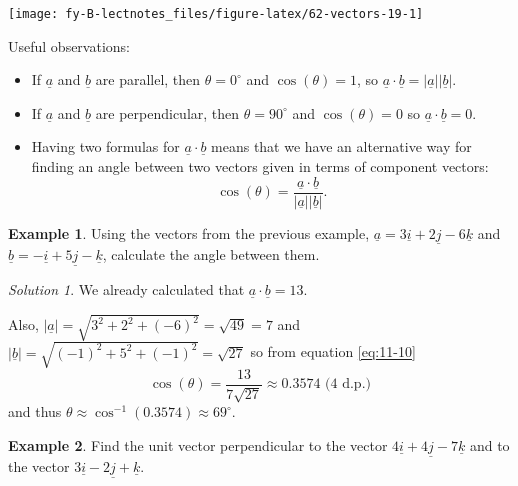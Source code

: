 \documentclass[
  11pt,
  oneside]{book}
\newcommand{\slide}{}
\theoremstyle{definition}
\theoremstyle{definition}
\newtheorem{example}{Example}[chapter]
\theoremstyle{definition}
\theoremstyle{definition}
\theoremstyle{remark}
\newtheorem*{solution}{Solution}
\begin{document}
\begin{center}\texttt{[image: fy-B-lectnotes\_files/figure-latex/62-vectors-19-1]} \end{center}
\slide

Useful observations:

\begin{itemize}
\item
  If \(\underline a\) and \(\underline b\) are parallel, then \(\theta = 0^\circ\) and \(\cos(\theta) = 1\), so \(\underline a \cdot\underline b = |\underline a||\underline b|\).
\item
  If \(\underline a\) and \(\underline b\) are perpendicular, then \(\theta = 90^\circ\) and \(\cos(\theta) = 0\) so \(\underline a \cdot\underline b = 0\).
\item
  Having two formulas for \(\underline{a}\cdot\underline{b}\) means that we have an alternative way for finding an angle between two vectors given in terms of component vectors:
  \begin{equation}
  \cos(\theta) = \frac{\underline a\cdot\underline b}{|\underline a||\underline b|}.
  \label{eq:11-10}
  \end{equation}
\end{itemize}

\slide

\slide

\begin{example}
Using the vectors from the previous example, \(\underline a = 3\underline i + 2\underline j - 6\underline k\) and \(\underline b = -\underline i + 5\underline j - \underline k\), calculate the angle between them.
\end{example}

\begin{solution}
We already calculated that \(\underline a\cdot\underline b = 13\).

Also, \(|\underline a| = \sqrt{3^2+2^2+(-6)^2}=\sqrt{49}=7\) and \(|\underline b| = \sqrt{(-1)^2+5^2+(-1)^2} = \sqrt{27}\) so from equation \eqref{eq:11-10}
\[
\cos(\theta) = \frac{13}{7\sqrt{27}} \approx 0.3574 \text{ (4 d.p.)}
\]
and thus \(\theta \approx \cos^{-1}(0.3574) \approx 69^\circ\).
\end{solution}

\slide

\begin{example}
Find the unit vector perpendicular to the vector \(4\underline i+4\underline j-7\underline k\) and to the vector \(3\underline i - 2\underline j+\underline k\).
\end{example}
\end{document}
